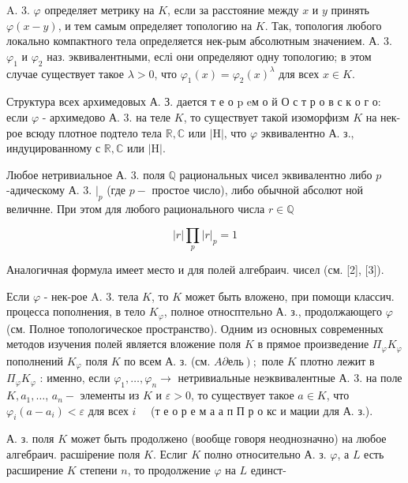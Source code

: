 \documentclass[10pt]{article}
\begin{document}
A. 3. $\varphi$ определяет метрику на $K$, если за расстояние между $x$ и $y$ принять $\varphi(x-y)$, и тем самым определяет топологию на $K$. Так, топология любого локально компактного тела определяется нек-рым абсолютным значением. А. 3. $\varphi_{1}$ и $\varphi_{2}$ наз. эквивалентными, еслі они определяют одну топологию; в этом случае существует такое $\lambda>0$, что $\varphi_{1}(x)=\varphi_{2}(x)^{\lambda}$ для всех $x \in K$.



Структура всех архимедовых А. З. дается т е о p eм о й О с т р о в с к о г о: если $\varphi$ - архимедово А. 3. на теле $K$, то существует такой изоморфизм $K$ на нек-рое всюду плотное подтело тела $\mathbb{R}, \mathbb{C}$ или $|\mathrm{H}|$, что $\varphi$ эквивалентно А. з., индуцированному с $\mathbb{R}, \mathbb{C}$ или $|\mathrm{H}|$.



Любое нетривиальное А. 3. поля $\mathbb{Q}$ рациональных чисел эквивалентно либо $p$-адическому А. 3. $\left.\right|_{p}$ (где $p-$ простое число), либо обычной абсолют ной величнне. При этом для любого рационального числа $r \in \mathbb{Q}$



\[

|r| \prod_{p}|r|_{p}=1

\]



Аналогичная формула имеет место и для полей алгебраич. чисел (см. [2], [3]).



Если $\varphi$ - нек-рое A. 3. тела $K$, то $K$ может быть вложено, при помощи классич. процесса пополнения, в тело $K_{\varphi}$, полное относптельно А. з., продолжающего $\varphi$ (см. Полное топологическое пространство). Одним из основных современных методов изучения полей является вложение поля $K$ в прямое произведение $\Pi_{\varphi} K_{\varphi}$ пополнений $K_{\varphi}$ поля $K$ по всем А. з. (см. $\left.A \partial е л ь\right) ;$ поле $K$ плотно лежит в $\Pi_{\varphi} K_{\varphi}$ : именно, если $\varphi_{1}, \ldots, \varphi_{n} \rightarrow$ нетривиальные неэквивалентные А. 3. на поле $K, a_{1}, \ldots$, $a_{n}-$ элементы из $K$ и $\varepsilon>0$, то существует такое $a \in K$, что $\varphi_{i}\left(a-a_{i}\right)<\varepsilon$ для всех $i \quad$ (т е о р е м а а п П р о кс и мации для А. з.).



А. з. поля $K$ может быть продолжено (вообще говоря неоднозначно) на любое алгебраич. расшірение поля $K$. Еслиг $K$ полно относительно А. з. $\varphi$, а $L$ есть расширение $K$ степени $n$, то продолжение $\varphi$ на $L$ единст-
\end{document}
